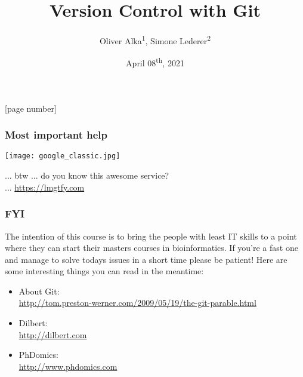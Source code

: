 \documentclass{beamer} %
\begin{document}
\author{Oliver Alka\textsuperscript{1}, Simone Lederer\textsuperscript{2}}
\title[Git]{Version Control with Git}
\date{April 08\textsuperscript{th}, 2021}
[page number]{}

\maketitle

\begin{frame}
\frametitle{Most important help}
\begin{center}

	\texttt{[image: google\_classic.jpg]}

	... btw ...  do you know this awesome service? \\
	... \url{https://lmgtfy.com}

\end{center}
\end{frame}

\begin{frame}
\frametitle{FYI}

The intention of this course is to bring the people with least IT skills to a point where
they can start their masters courses in bioinformatics. If you're a fast one and manage to
solve todays issues in a short time please be patient! Here are some interesting things you
can read in the meantime:

\begin{itemize}
    \setlength\itemsep{1em}
	\item About Git: \\ \url{http://tom.preston-werner.com/2009/05/19/the-git-parable.html}
    \item Dilbert: \\ \url{http://dilbert.com}
    \item PhDomics: \\ \url{http://www.phdomics.com}
\end{itemize}
\end{frame}
\end{document}
